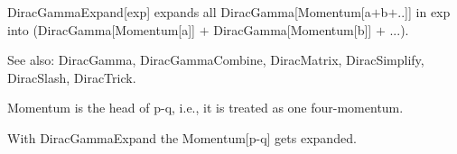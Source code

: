 












DiracGammaExpand[exp] expands all DiracGamma[Momentum[a\(+\)b\(+\)..]] in exp into (DiracGamma[Momentum[a]] \(+\) DiracGamma[Momentum[b]]
  \(+\) ...).

See also:  DiracGamma, DiracGammaCombine, DiracMatrix, DiracSimplify, DiracSlash, DiracTrick.




Momentum is the head of p-q, i.e., it is treated as one four-momentum.



With DiracGammaExpand the Momentum[p-q] gets expanded.



